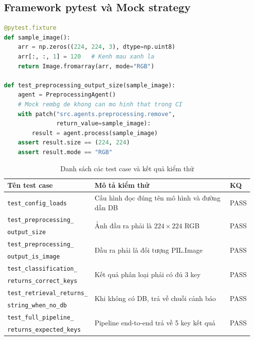 \documentclass[13pt,a4paper]{extreport}
\begin{document}
\subsection{Framework pytest và Mock strategy}
\begin{lstlisting}[language=Python, caption={Unit test cho Preprocessing Agent với mock rembg}, label={lst:test_preprocessing}]
@pytest.fixture
def sample_image():
    arr = np.zeros((224, 224, 3), dtype=np.uint8)
    arr[:, :, 1] = 120   # Kenh mau xanh la
    return Image.fromarray(arr, mode="RGB")

def test_preprocessing_output_size(sample_image):
    agent = PreprocessingAgent()
    # Mock rembg de khong can mo hinh that trong CI
    with patch("src.agents.preprocessing.remove",
               return_value=sample_image):
        result = agent.process(sample_image)
    assert result.size == (224, 224)
    assert result.mode == "RGB"
\end{lstlisting}

\begin{table}[H]
\centering
\small
\setlength{\tabcolsep}{4pt}
\caption{Danh sách các test case và kết quả kiểm thử}
\label{tab:test_cases}
\begin{tabular}{p{5.5cm} p{7.2cm} p{1.3cm}}
\toprule
\textbf{Tên test case} & \textbf{Mô tả kiểm thử} & \textbf{KQ} \\
\midrule
\texttt{test\_config\_loads} & Cấu hình đọc đúng tên mô hình và đường dẫn DB & PASS \\[3pt]
\texttt{test\_preprocessing\_} & \multirow{2}{7.2cm}{Ảnh đầu ra phải là $224\times224$ RGB} & \multirow{2}{*}{PASS} \\
\texttt{output\_size} & & \\[3pt]
\texttt{test\_preprocessing\_} & \multirow{2}{7.2cm}{Đầu ra phải là đối tượng PIL.Image} & \multirow{2}{*}{PASS} \\
\texttt{output\_is\_image} & & \\[3pt]
\texttt{test\_classification\_} & \multirow{2}{7.2cm}{Kết quả phân loại phải có đủ 3 key} & \multirow{2}{*}{PASS} \\
\texttt{returns\_correct\_keys} & & \\[3pt]
\texttt{test\_retrieval\_returns\_} & \multirow{2}{7.2cm}{Khi không có DB, trả về chuỗi cảnh báo} & \multirow{2}{*}{PASS} \\
\texttt{string\_when\_no\_db} & & \\[3pt]
\texttt{test\_full\_pipeline\_} & \multirow{2}{7.2cm}{Pipeline end-to-end trả về 5 key kết quả} & \multirow{2}{*}{PASS} \\
\texttt{returns\_expected\_keys} & & \\
\bottomrule
\end{tabular}
\end{table}
\end{document}

